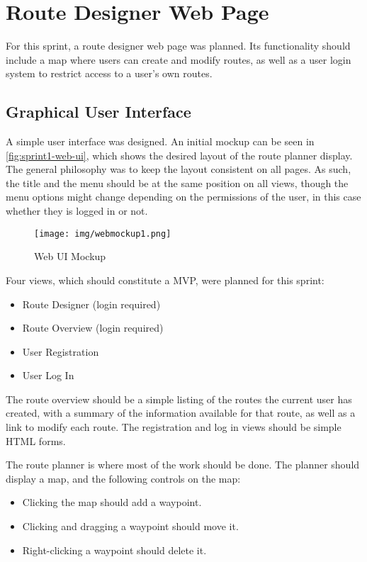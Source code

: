 \section{Route Designer Web Page}
\label{sec:sprint1-web}

For this sprint, a route designer web page was planned. Its functionality should include a map where users can create and modify routes, as well as a user login system to restrict access to a user's own routes.

\subsection{Graphical User Interface}
\label{sub:sprint1-web-gui}

A simple user interface was designed. An initial mockup can be seen in \autoref{fig:sprint1-web-ui}, which shows the desired layout of the route planner display. The general philosophy was to keep the layout consistent on all pages. As such, the title and the menu should be at the same position on all views, though the menu options might change depending on the permissions of the user, in this case whether they is logged in or not.

\begin{figure}[!ht]
	\centering
	\texttt{[image: img/webmockup1.png]}
	\caption{Web UI Mockup}
	\label{fig:sprint1-web-ui}
\end{figure}

Four views, which should constitute a \ac{MVP}, were planned for this sprint:

\begin{itemize}
	\item{Route Designer} (login required)
	\item{Route Overview} (login required)
	\item{User Registration}
	\item{User Log In}
\end{itemize}

The route overview should be a simple listing of the routes the current user has created, with a summary of the information available for that route, as well as a link to modify each route. The registration and log in views should be simple \ac{HTML} forms.

The route planner is where most of the work should be done. The planner should display a map, and the following controls on the map:

\begin{itemize}
	\item{Clicking the map should add a waypoint.}
	\item{Clicking and dragging a waypoint should move it.}
	\item{Right-clicking a waypoint should delete it.}
\end{itemize}

